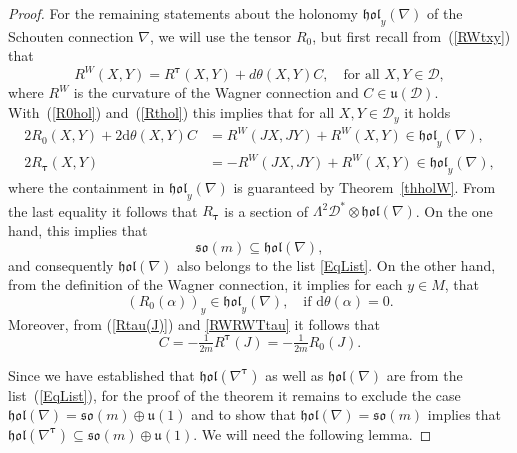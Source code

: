 \documentclass{amsart}
\theoremstyle{plain}
\theoremstyle{definition}
\def\R{\mathcal{R}}
\def\so{\mathfrak{so}}
\def\su{\mathfrak{su}}
\def\u{\mathfrak{u}}
\newcommand{\hol}{\mathfrak{hol}}
\newcommand{\bt}{{\boldsymbol{\tau}}}
\newcommand{\Real}{\mathbb{R}}
\newcommand{\1}{\mathbf{1}}
\newcommand{\D}{{\mathcal D}}
\renewcommand{\d}{\mathrm{d}}
\newcommand{\+}{\oplus}
\newcommand{\tcom}[1]{
 \marginpar{{\scriptsize  T: #1 }}}
\begin{document}
\begin{proof}
For the remaining statements about  the holonomy $\hol_y(\nabla)$ of the Schouten connection $\nabla$, we will use the tensor $R_0$, but  first recall from~(\ref{RWtxy}) that
 \begin{equation}\label{RWRWTtau}
R^W(X,Y)=R^\bt(X,Y)+d\theta(X,Y)C,\quad \text{for all } X,Y\in\D,\end{equation}
where $R^W$ is the curvature of the Wagner connection and
$C\in\u(\D)$.
With~(\ref{R0hol}) and~(\ref{Rthol}) this implies that for all $X,Y\in \D_y$ it holds
\begin{align}\label{2R0+2theta}
2R_0(X,Y)+2\d \theta(X,Y) C&=R^{W}(JX,JY)+R^{W}(X,Y)\in\hol_y(\nabla),\\
\label{Rbthol}
2R_\bt(X,Y)&=-R^{W}(JX,JY)+R^{W}(X,Y)\in\hol_y(\nabla),
\end{align}
where the containment in $\hol_y(\nabla)$ is guaranteed by Theorem~\ref{thholW}.
From the last equality it follows that 
$R_\bt$ is a section of $\Lambda^2\D^*\otimes \hol(\nabla)$. On the one hand, this implies that
$$\so(m)\subseteq\hol(\nabla),$$ and consequently $\hol(\nabla)$ also belongs to the list \eqref{EqList}.
On the other hand, from the definition of the Wagner connection, it implies  for each $y\in M$, that
\begin{equation}\label{R_0(alpha)}
(R_0(\alpha))_y\in \hol_y(\nabla),\quad\textrm{if } \d\theta(\alpha)=0.
\end{equation}
Moreover, 
from (\ref{Rtau(J)}) and \eqref{RWRWTtau} it follows that
\begin{equation}\label{CR_0}
C=-\tfrac{1}{2m}R^\bt(J)=-\tfrac{1}{2m}R_0(J).  
\end{equation}


Since we have established that 
$\hol(\nabla^\bt)$ as well as $\hol(\nabla)$ are from the list~(\ref{EqList}), for the proof of the theorem it remains to exclude the case $\hol(\nabla)=\so(m)\+\u(1)$ and to show that $\hol(\nabla)=\so(m)$ implies that $\hol(\nabla^\bt)\subseteq \so(m)\+\u(1)$. 
We will need the following lemma.



\end{proof}
\end{document}
